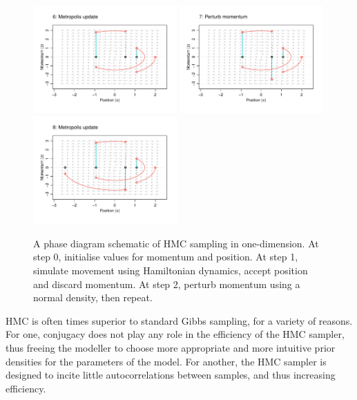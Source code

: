 \begin{figure}[p]
  \includegraphics[width=0.49\textwidth]{figure/04-phase6}
  \vspace{-20pt}  
  \includegraphics[width=0.49\textwidth]{figure/04-phase7}
  \includegraphics[width=0.49\textwidth]{figure/04-phase8}
  \caption[A phase diagram schematic of HMC sampling in one-dimension. At step 0, initialise values for momentum and position]{A phase diagram schematic of HMC sampling in one-dimension. At step 0, initialise values for momentum and position. At step 1, simulate movement using Hamiltonian dynamics, accept position and discard momentum. At step 2, perturb momentum using a normal density, then repeat.}
\end{figure}
\vspace{-0.5em}

HMC is often times superior to standard Gibbs sampling, for a variety of reasons. 
For one, conjugacy does not play any role in the efficiency of the HMC sampler, thus freeing the modeller to choose more appropriate and more intuitive prior densities for the parameters of the model. 
For another, the HMC sampler is designed to incite little autocorrelations between samples, and thus increasing efficiency.

